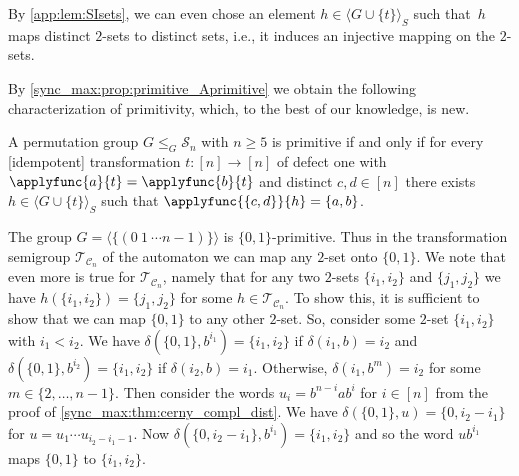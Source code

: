   \begin{remark}
  	By \cref{app:lem:SIsets},
  	we can even chose an element $h \in \langle G \cup \{t\} \rangle_S$
  	such that~$h$ maps distinct $2$-sets to distinct sets, i.e.,
  	it induces an injective mapping on the $2$-sets.
  \end{remark}
   
 By \cref{sync_max:prop:primitive_Aprimitive} 
 we obtain the following characterization of primitivity,
 which, to the best of our knowledge, is new.
  
\begin{corollary} \label{sync_max:cor:prim-2-hom}
	A permutation group $G \le_G \mathcal S_n$ with $n \ge 5$
	is primitive
	if and only if for every [idempotent]
	transformation $t \colon [n] \to [n]$
	of defect one with $\applyfunc{a}{t} = \applyfunc{b}{t}$
	and distinct $c,d \in [n]$
	there exists $h \in \langle G \cup \{t\} \rangle_S$
	such that $\applyfunc{\{c,d\}}{h} = \{a,b\}$. 		
\end{corollary}

\begin{example}
	The group $G = \langle \{ (0 ~ 1 ~ \cdots n - 1) \} \rangle$
	is $\{0,1\}$-primitive.
	Thus in the transformation semigroup 
	$\mathcal T_{\mathcal C_n}$ of the \Cerny automaton
	we can map any $2$-set onto $\{0,1\}$.
	We note that even more is true for $\mathcal T_{\mathcal C_n}$,
	namely that for any two $2$-sets
	$\{i_1, i_2\}$ and $\{j_1, j_2\}$
	we have $h(\{i_1, i_2\}) = \{j_1, j_2\}$
	for some $h \in \mathcal T_{\mathcal C_n}$.		
	To show this, it is sufficient to show that we can map $\{0,1\}$
	to any other $2$-set. So, consider some $2$-set $\{i_1, i_2\}$ with $i_1 < i_2$.
	We have $\delta(\{0,1\}, b^{i_1}) = \{i_1, i_2\}$
	if $\delta(i_1, b) = i_2$
	and $\delta(\{0,1\}, b^{i_2}) = \{i_1, i_2\}$
	if $\delta(i_2, b) = i_1$.
	Otherwise, $\delta(i_1, b^m) = i_2$
	for some $m \in \{2,\ldots,n-1\}$.
	Then consider the words $u_i = b^{n - i} a b^i$
	for $i \in [n]$ from the proof of \cref{sync_max:thm:cerny_compl_dist}.
	We have $\delta(\{0,1\}, u) = \{0, i_2 - i_1\}$ for $u =  u_1 \cdots u_{i_2-i_1-1}$.
	Now $\delta(\{0, i_2 - i_1\}, b^{i_1}) = \{i_1, i_2\}$
	and so the word $u b^{i_1}$
	maps $\{0,1\}$ to $\{i_1, i_2\}$.	
\end{example}

